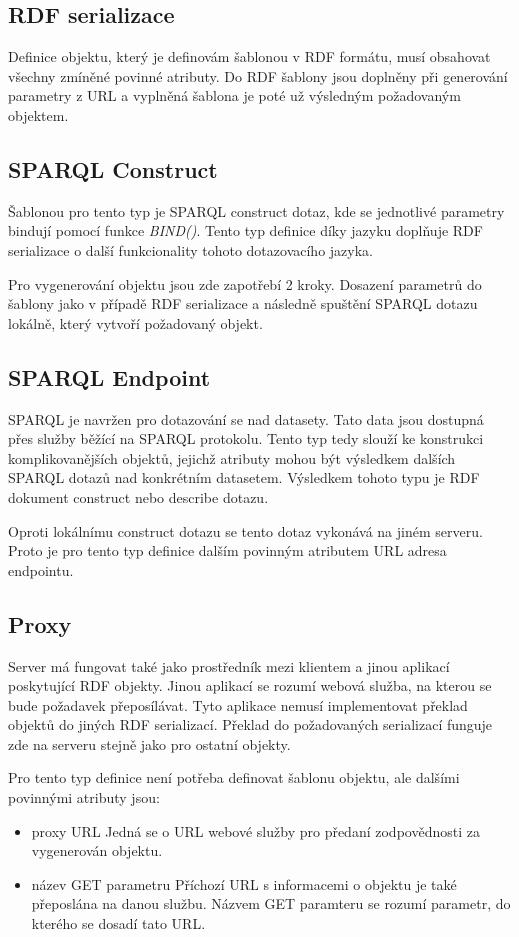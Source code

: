 \documentclass[thesis=B,czech]{FITthesis}[2012/06/26]
\begin{document}
 \subsection{RDF serializace}
   Definice objektu, který je definovám šablonou v RDF formátu, musí obsahovat všechny zmíněné povinné atributy. Do RDF šablony jsou doplněny při generování parametry z
   URL a vyplněná šablona je poté už výsledným požadovaným objektem.
 
 \subsection{SPARQL Construct}
  Šablonou pro tento typ je SPARQL construct dotaz, kde se jednotlivé parametry bindují pomocí funkce \textit{BIND()}. Tento typ definice díky jazyku 
  doplňuje RDF serializace o další funkcionality tohoto dotazovacího jazyka.
  
  Pro vygenerování objektu jsou zde zapotřebí 2 kroky. Dosazení parametrů do šablony jako v případě RDF serializace a následně spuštění SPARQL dotazu lokálně, který
  vytvoří požadovaný objekt.
  
 \subsection{SPARQL Endpoint}
  SPARQL je navržen pro dotazování se nad datasety. Tato data jsou dostupná přes služby běžící na SPARQL protokolu. Tento typ tedy slouží ke konstrukci
  komplikovanějších objektů, jejichž atributy mohou být výsledkem dalších SPARQL dotazů nad konkrétním datasetem. Výsledkem tohoto typu je RDF dokument construct
  nebo describe dotazu.
  
  Oproti lokálnímu construct dotazu se tento dotaz vykonává na jiném serveru. Proto je pro tento typ definice dalším povinným atributem URL adresa endpointu.
  
 \subsection{Proxy}
  Server má fungovat také jako prostředník mezi klientem a jinou aplikací poskytující RDF objekty. Jinou aplikací se rozumí webová služba, na kterou se bude požadavek
  přeposílávat. Tyto aplikace nemusí implementovat překlad objektů do jiných RDF serializací. Překlad do požadovaných serializací funguje zde na serveru stejně jako
  pro ostatní objekty.
  
  Pro tento typ definice není potřeba definovat šablonu objektu, ale dalšími povinnými atributy jsou:
  \begin{itemize}
  \item proxy URL
    \subitem Jedná se o URL webové služby pro předaní zodpovědnosti za vygenerován objektu.
    
  \item název GET parametru
    \subitem Příchozí URL s informacemi o objektu je také přeposlána na danou službu. Názvem GET paramteru se rozumí parametr, do kterého se dosadí tato URL.
 \end{itemize}
 
\end{document}
